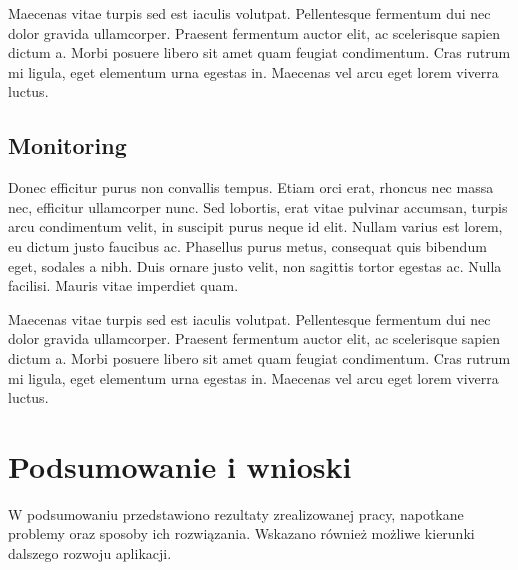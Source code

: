 \documentclass[times]{san}
\begin{document}
Maecenas vitae turpis sed est iaculis volutpat. Pellentesque fermentum dui nec dolor gravida ullamcorper. Praesent fermentum auctor elit, ac scelerisque sapien dictum a. Morbi posuere libero sit amet quam feugiat condimentum. Cras rutrum mi ligula, eget elementum urna egestas in. Maecenas vel arcu eget lorem viverra luctus.

\subsection{Monitoring}
Donec efficitur purus non convallis tempus. Etiam orci erat, rhoncus nec massa nec, efficitur ullamcorper nunc. Sed lobortis, erat vitae pulvinar accumsan, turpis arcu condimentum velit, in suscipit purus neque id elit. Nullam varius est lorem, eu dictum justo faucibus ac. Phasellus purus metus, consequat quis bibendum eget, sodales a nibh. Duis ornare justo velit, non sagittis tortor egestas ac. Nulla facilisi. Mauris vitae imperdiet quam. 

Maecenas vitae turpis sed est iaculis volutpat. Pellentesque fermentum dui nec dolor gravida ullamcorper. Praesent fermentum auctor elit, ac scelerisque sapien dictum a. Morbi posuere libero sit amet quam feugiat condimentum. Cras rutrum mi ligula, eget elementum urna egestas in. Maecenas vel arcu eget lorem viverra luctus.

\section{Podsumowanie i wnioski}

W podsumowaniu przedstawiono rezultaty zrealizowanej pracy,
napotkane problemy oraz sposoby ich rozwiązania. Wskazano również
możliwe kierunki dalszego rozwoju aplikacji.

\spistabel
\spisrysunkow
\printbibliography
\end{document}
